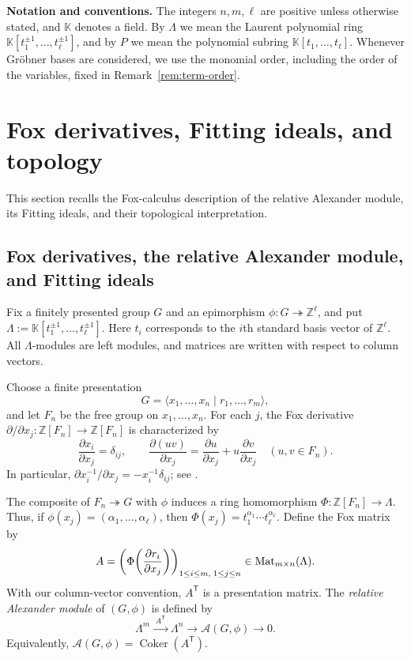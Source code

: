 \documentclass{article}
\theoremstyle{definition}
\theoremstyle{plain}
\def\Coker{\mathop{\mathrm{Coker}}\nolimits}
\newcommand{\Mat}{{\rm Mat}}
\newcommand{\Z}{\mathbb{Z}}
\newcommand{\K}{\mathbb{K}}
\begin{document}
\medskip
\noindent\textbf{Notation and conventions.}
The integers \(n,m,\ell\) are positive unless otherwise stated, and \(\K\)
denotes a field.  
By $\Lambda$ we mean the Laurent polynomial ring $\K[t_1^{\pm1},\dots,t_\ell^{\pm1}]$,
and by $P$ we mean the polynomial subring $\K[t_1, \dots,t_\ell]$.
Whenever Gr\"obner bases are considered, we
use the monomial order, including the order of the variables, fixed in
Remark~\ref{rem:term-order}.

\section{Fox derivatives, Fitting ideals, and topology}\label{sec:preliminaries}

This section recalls the Fox-calculus description of the relative Alexander
module, its Fitting ideals, and their topological interpretation.

\subsection{Fox derivatives, the relative Alexander module, and Fitting ideals}\label{subsec:fox}

Fix a finitely presented group \(G\) and an epimorphism
\(\phi\colon G\twoheadrightarrow \Z^\ell\), and put
\(\Lambda:=\K[t_1^{\pm1},\dots,t_\ell^{\pm1}]\).
Here \(t_i\) corresponds to the \(i\)th standard basis vector of
\(\Z^\ell\). All \(\Lambda\)-modules are left modules, and matrices are
written with respect to column vectors.

Choose a finite presentation
\[
G=\langle x_1,\dots,x_n\mid r_1,\dots,r_m\rangle,
\]
and let \(F_n\) be the free group on \(x_1,\dots,x_n\). For each \(j\),
the Fox derivative \(\partial/\partial x_j\colon\Z[F_n]\to\Z[F_n]\) is
characterized by
\[
\frac{\partial x_i}{\partial x_j}=\delta_{ij},
\qquad
\frac{\partial(uv)}{\partial x_j}
 =\frac{\partial u}{\partial x_j}
  +u\frac{\partial v}{\partial x_j}
\quad (u,v\in F_n).
\]
In particular,
\(\partial x_i^{-1}/\partial x_j=-x_i^{-1}\delta_{ij}\); see
\cite{Fox1953}.

The composite of \(F_n\twoheadrightarrow G\) with \(\phi\) induces a ring
homomorphism \(\Phi\colon\Z[F_n]\to\Lambda\). Thus, if
\(\phi(x_j)=(\alpha_1,\dots,\alpha_\ell)\), then
\(\Phi(x_j)=t_1^{\alpha_1}\cdots t_\ell^{\alpha_\ell}\). Define the Fox
matrix by
\[
A=
\left(
 \Phi\!\left(\frac{\partial r_i}{\partial x_j}\right)
\right)_{1\le i\le m,\;1\le j\le n}
\in\Mat_{m\times n}(\Lambda).
\]
With our column-vector convention, \(A^{\mathsf T}\) is a presentation
matrix. The \emph{relative Alexander module} of \((G,\phi)\) is defined by
\[
\Lambda^m\xrightarrow{\;A^{\mathsf T}\;}\Lambda^n
 \longrightarrow \mathcal A(G,\phi)
 \longrightarrow 0.
\]
Equivalently, \(\mathcal A(G,\phi)=\Coker(A^{\mathsf T})\).
\end{document}
